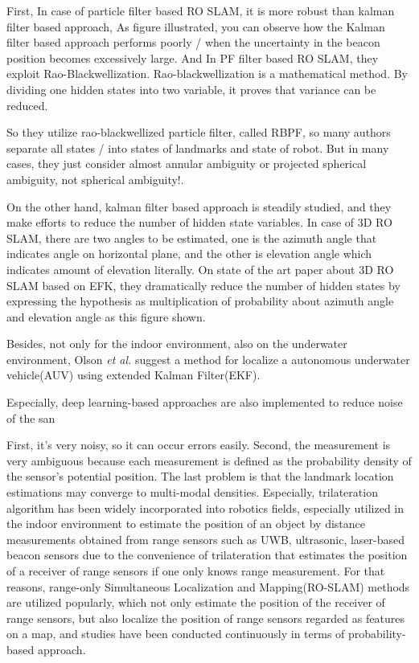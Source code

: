 \documentclass{ieeeaccess}
\begin{document}
 

  
 First, In case of particle filter based RO SLAM, it is more robust than kalman filter based approach, As figure illustrated, you can observe how the Kalman filter based approach performs poorly / when the uncertainty in the beacon position becomes excessively large. And In PF filter based RO SLAM, they exploit Rao-Blackwellization. Rao-blackwellization is a mathematical method. By dividing one hidden states into two variable, it proves that variance can be reduced. 
 
 So they utilize rao-blackwellized particle filter, called RBPF, so many authors separate all states / into states of landmarks and state of robot. But in many cases, they just consider almost annular ambiguity or projected spherical ambiguity, not spherical ambiguity!. 
 
 
 On the other hand, kalman filter based approach is steadily studied, and they make efforts to reduce the number of hidden state variables. In case of 3D RO SLAM, there are two angles to be estimated, one is the azimuth angle that indicates angle on horizontal plane, and the other is elevation angle which indicates amount of elevation literally. On state of the art paper about 3D RO SLAM based on EFK, they dramatically reduce the number of hidden states by expressing the hypothesis as multiplication of probability about azimuth angle and elevation angle as this figure shown. 
 
 
 Besides, not only for the indoor environment, also on the underwater environment, Olson \textit{et al.} suggest a method for localize a autonomous underwater vehicle(AUV) using extended Kalman Filter(EKF)\cite{olson2006robust}.
 
 Especially, deep learning-based approaches are also implemented to reduce noise of the san
 
 First, it’s very noisy, so it can occur errors easily. Second, the measurement is very ambiguous because each measurement is defined as the probability density of the sensor’s potential position. The last problem is that the landmark location estimations may converge to multi-modal densities.
 Especially, trilateration algorithm has been widely incorporated into robotics fields, especially utilized in the indoor environment to estimate the position of an object by distance measurements obtained from range sensors such as UWB, ultrasonic, laser-based beacon sensors \cite{thomas2005revisiting, cho2010mobile,raghavan2010accurate} due to the convenience of trilateration that estimates the position of a receiver of range sensors if one only knows range measurement. For that reasons, range-only Simultaneous Localization and Mapping(RO-SLAM) methods are utilized popularly, which not only estimate the position of the receiver of range sensors, but also localize the position of range sensors regarded as features on a map, and studies have been conducted continuously in terms of probability-based approach\cite{blanco2008pure,blanco2008efficient,fabresse2013undelayed, shetty2018particle}.
\end{document}
